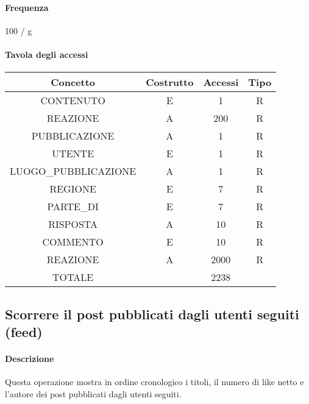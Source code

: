 \documentclass[a4paper,12pt]{report}
\begin{document}
\paragraph{Frequenza} 100 / g
\begin{table}[H]
\paragraph{Tavola degli accessi\newline}
\begin{tabular}{|c|c|c|c|}
\hline
Concetto             & Costrutto & Accessi & Tipo \\ \hline
CONTENUTO            & E         & 1       & R    \\ \hline
REAZIONE             & A         & 200     & R    \\ \hline
PUBBLICAZIONE        & A         & 1       & R    \\ \hline
UTENTE               & E         & 1       & R    \\ \hline
LUOGO\_PUBBLICAZIONE & A         & 1       & R    \\ \hline
REGIONE              & E         & 7       & R    \\ \hline
PARTE\_DI            & E         & 7       & R    \\ \hline
RISPOSTA             & A         & 10      & R    \\ \hline
COMMENTO             & E         & 10      & R    \\ \hline
REAZIONE             & A         & 2000    & R    \\ \hline
TOTALE               &           & 2238    &      \\ \hline
\end{tabular}
\end{table}
\subsection{Scorrere il post pubblicati dagli utenti seguiti (feed)} \label{feed}
\paragraph{Descrizione} Questa operazione mostra in ordine cronologico i titoli, il numero di like netto e l'autore dei post pubblicati dagli utenti seguiti.
\end{document}
